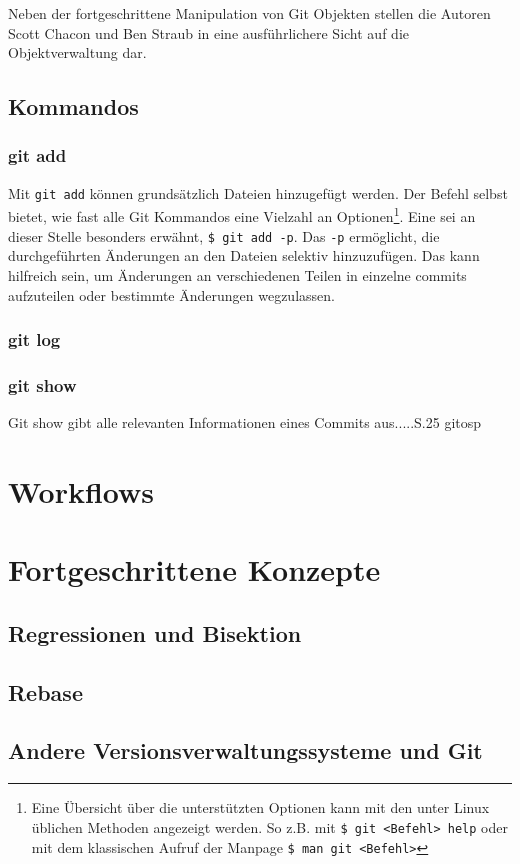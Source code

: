 Neben der fortgeschrittene Manipulation von Git Objekten stellen die Autoren
Scott Chacon und Ben Straub in \cite[S.~408-418]{progit} eine ausführlichere
Sicht auf die Objektverwaltung dar.

\subsection{Kommandos}\label{sec:commands}

\subsubsection{git add}\label{sec:gitadd}
Mit \texttt{git add} können grundsätzlich Dateien hinzugefügt werden. Der
Befehl selbst bietet, wie fast alle Git Kommandos eine Vielzahl an
Optionen\footnote{Eine Übersicht über die unterstützten Optionen kann mit den
unter Linux üblichen Methoden angezeigt werden. So z.B. mit \texttt{\$ git <Befehl>
help} oder mit dem klassischen Aufruf der Manpage \texttt{\$ man git <Befehl>}}.
Eine sei an dieser Stelle besonders erwähnt, \texttt{\$ git add -p}. Das
\texttt{-p} ermöglicht, die durchgeführten Änderungen an den Dateien selektiv
hinzuzufügen. Das kann hilfreich sein, um Änderungen an verschiedenen Teilen in
einzelne \glspl{commit} aufzuteilen oder bestimmte Änderungen wegzulassen.

\subsubsection{git log}\label{sec:gitlog}
\subsubsection{git show}\label{sec:gitshow}
Git show gibt alle relevanten Informationen eines Commits aus.....S.25 gitosp

\section{Workflows}\label{sec:Workflows}
\section{Fortgeschrittene Konzepte}
\label{sec:FortgeschritteneKonzepte}
\subsection{Regressionen und Bisektion}\label{sec:bisec}
\subsection{Rebase}\label{sec:rebase}
\subsection{Andere Versionsverwaltungssysteme und Git}
\label{sec:AndereVersionsverwaltungssystemeundGit}
